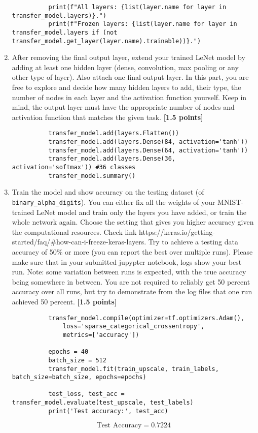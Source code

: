 \begin{enumerate}
\begin{lstlisting}
          print(f"All layers: {list(layer.name for layer in transfer_model.layers)}.")
          print(f"Frozen layers: {list(layer.name for layer in transfer_model.layers if (not transfer_model.get_layer(layer.name).trainable))}.")
        \end{lstlisting}
  \item After removing the final output layer, extend your trained LeNet model by adding at least one hidden layer (dense, convolution, max pooling or any other type of layer). Also attach one final output layer. In this part, you are free to explore and decide how many hidden layers to add, their type, the number of nodes in each layer and the activation function yourself. Keep in mind, the output layer must have the appropriate number of nodes and activation function that matches the given task. {\bf [1.5 points]}
        \begin{lstlisting}
          transfer_model.add(layers.Flatten())
          transfer_model.add(layers.Dense(84, activation='tanh'))
          transfer_model.add(layers.Dense(64, activation='tanh'))
          transfer_model.add(layers.Dense(36, activation='softmax')) #36 classes
          transfer_model.summary()
        \end{lstlisting}
  \item Train the model and show accuracy on the testing dataset (of \lstinline{binary_alpha_digits}). You can either fix all the weights of your MNIST-trained LeNet model and train only the layers you have added, or train the whole network again. Choose the setting that gives you higher accuracy given the computational resources. Check link https://keras.io/getting-started/faq/\#how-can-i-freeze-keras-layers. Try to achieve a testing data accuracy of 50\% or more (you can report the best over multiple runs). Please make sure that in your submitted jupypter notebook, logs show your best run. Note: some variation between runs is expected, with the true accuracy being somewhere in between. You are not required to reliably get 50 percent accuracy over all runs, but try to demonstrate from the log files that one run achieved 50 percent. {\bf [1.5 points]}
        \begin{lstlisting}
          transfer_model.compile(optimizer=tf.optimizers.Adam(),
              loss='sparse_categorical_crossentropy',
              metrics=['accuracy'])
          
          epochs = 40
          batch_size = 512
          transfer_model.fit(train_upscale, train_labels, batch_size=batch_size, epochs=epochs)

          test_loss, test_acc = transfer_model.evaluate(test_upscale, test_labels)
          print('Test accuracy:', test_acc)
        \end{lstlisting}
        $$\text{Test Accuracy}=0.7224$$
\end{enumerate}
